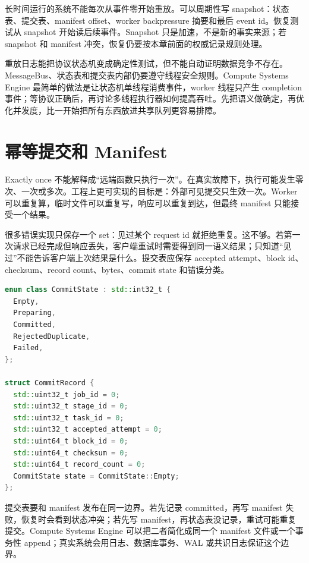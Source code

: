 长时间运行的系统不能每次从事件零开始重放。可以周期性写 snapshot：状态表、提交表、manifest offset、worker backpressure 摘要和最后 event id。恢复测试从 snapshot 开始读后续事件。Snapshot 只是加速，不是新的事实来源；若 snapshot 和 manifest 冲突，恢复仍要按本章前面的权威记录规则处理。

重放日志能把协议状态机变成确定性测试，但不能自动证明数据竞争不存在。MessageBus、状态表和提交表内部仍要遵守线程安全规则。Compute Systems Engine 最简单的做法是让状态机单线程消费事件，worker 线程只产生 completion 事件；等协议正确后，再讨论多线程执行器如何提高吞吐。先把语义做确定，再优化并发度，比一开始把所有东西放进共享队列更容易排障。

\section{幂等提交和 Manifest}

Exactly once 不能解释成“远端函数只执行一次”。在真实故障下，执行可能发生零次、一次或多次。工程上更可实现的目标是：外部可见提交只生效一次。Worker 可以重复算，临时文件可以重复写，响应可以重复到达，但最终 manifest 只能接受一个结果。

很多错误实现只保存一个 set：见过某个 request id 就拒绝重复。这不够。若第一次请求已经完成但响应丢失，客户端重试时需要得到同一语义结果；只知道“见过”不能告诉客户端上次结果是什么。提交表应保存 accepted attempt、block id、checksum、record count、bytes、commit state 和错误分类。

\begin{lstlisting}[language=C++,caption={提交表记录外部可见事实}]
enum class CommitState : std::int32_t {
  Empty,
  Preparing,
  Committed,
  RejectedDuplicate,
  Failed,
};

struct CommitRecord {
  std::uint32_t job_id = 0;
  std::uint32_t stage_id = 0;
  std::uint32_t task_id = 0;
  std::uint32_t accepted_attempt = 0;
  std::uint64_t block_id = 0;
  std::uint64_t checksum = 0;
  std::uint64_t record_count = 0;
  CommitState state = CommitState::Empty;
};
\end{lstlisting}

提交表要和 manifest 发布在同一边界。若先记录 committed，再写 manifest 失败，恢复时会看到状态冲突；若先写 manifest，再状态表没记录，重试可能重复提交。Compute Systems Engine 可以把二者简化成同一个 manifest 文件或一个事务性 append；真实系统会用日志、数据库事务、WAL 或共识日志保证这个边界。

